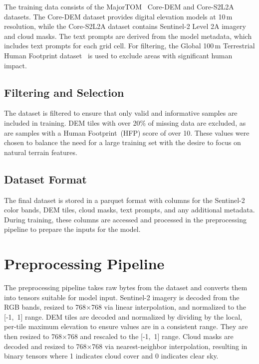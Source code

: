 The training data consists of the MajorTOM~\cite{schulz2024majortom} Core-DEM and Core-S2L2A datasets. The Core-DEM dataset provides digital elevation models at 10\,m resolution, while the Core-S2L2A dataset contains Sentinel-2 Level 2A imagery and cloud masks. The text prompts are derived from the model metadata, which includes text prompts for each grid cell. For filtering, the Global 100\,m Terrestrial Human Footprint dataset~\cite{gassert2023hfp100} is used to exclude areas with significant human impact.

\subsection{Filtering and Selection}
\label{subsec:filtering_and_selection}

The dataset is filtered to ensure that only valid and informative samples are included in training. DEM tiles with over 20\% of missing data are excluded, as are samples with a Human Footprint~(HFP) score of over 10. These values were chosen to balance the need for a large training set with the desire to focus on natural terrain features.

\subsection{Dataset Format}
\label{subsec:dataset_format}

The final dataset is stored in a parquet format with columns for the Sentinel-2 color bands, DEM tiles, cloud masks, text prompts, and any additional metadata. During training, these columns are accessed and processed in the preprocessing pipeline to prepare the inputs for the model.

\section{Preprocessing Pipeline}
\label{sec:preprocessing_pipeline}

The preprocessing pipeline takes raw bytes from the dataset and converts them into tensors suitable for model input. Sentinel-2 imagery is decoded from the RGB bands, resized to 768$\times$768 via linear interpolation, and normalized to the [-1,~1] range. DEM tiles are decoded and normalized by dividing by the local, per-tile maximum elevation to ensure values are in a consistent range. They are then resized to 768$\times$768 and rescaled to the [-1,~1] range. Cloud masks are decoded and resized to 768$\times$768 via nearest-neighbor interpolation, resulting in binary tensors where 1 indicates cloud cover and 0 indicates clear sky.

